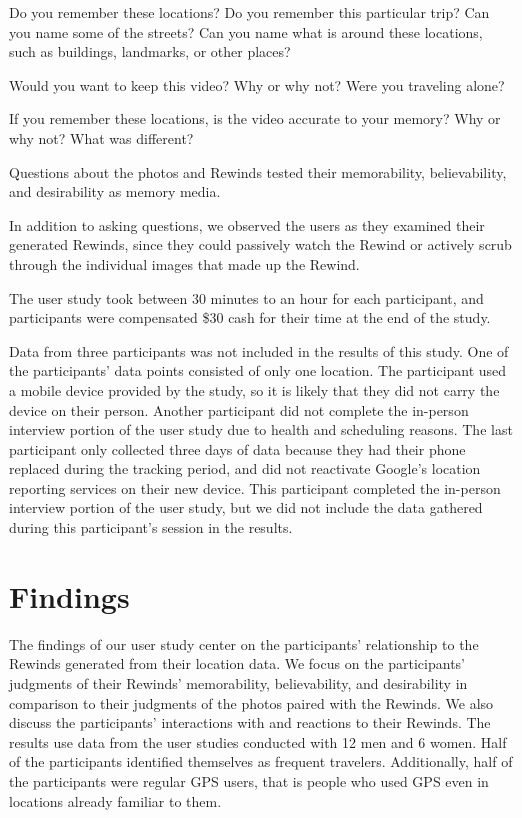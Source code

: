 \documentclass{sigchi}
\begin{document}
Do you remember these locations? Do you remember this particular trip? Can  you name some of the streets? Can you name what is around these locations, such as buildings, landmarks, or other places?

Would you want to keep this video? Why or why not? Were you traveling alone?

If you remember these locations, is the video accurate to your memory? Why or why not? What was different?

Questions about the photos and Rewinds tested their memorability, believability, and desirability as memory media.

In addition to asking questions, we observed the users as they examined their generated Rewinds, since they could passively watch the Rewind or actively scrub through the individual images that made up the Rewind. 

The user study took between 30 minutes to an hour for each participant, and participants were compensated \$30 cash for their time at the end of the study.

Data from three participants was not included in the results of this study. One of the participants' data points consisted of only one location. The participant used a mobile device provided by the study, so it is likely that they did not carry the device on their person. Another participant did not complete the in-person interview portion of the user study due to health and scheduling reasons. The last participant only collected three days of data because they had their phone replaced during the tracking period, and did not reactivate Google's location reporting services on their new device. This participant completed the in-person interview portion of the user study, but we did not include the data gathered during this participant's session in the results.

\section{Findings}
The findings of our user study center on the participants' relationship to the Rewinds generated from their location data. We focus on the participants' judgments of their Rewinds' memorability, believability, and desirability in comparison to their judgments of the photos paired with the Rewinds. We also discuss the participants' interactions with and reactions to their Rewinds. The results use data from the user studies conducted with 12 men and 6 women. Half of the participants identified themselves as frequent travelers. Additionally, half of the participants were regular GPS users, that is people who used GPS even in locations already familiar to them.
\end{document}
